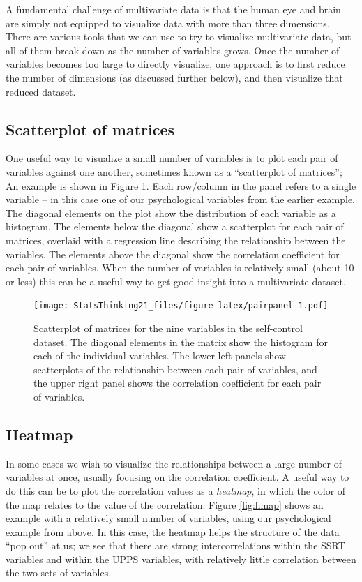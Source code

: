 \documentclass[
  12pt,
]{book}
\begin{document}
A fundamental challenge of multivariate data is that the human eye and brain are simply not equipped to visualize data with more than three dimensions. There are various tools that we can use to try to visualize multivariate data, but all of them break down as the number of variables grows. Once the number of variables becomes too large to directly visualize, one approach is to first reduce the number of dimensions (as discussed further below), and then visualize that reduced dataset.

\hypertarget{scatterplot-of-matrices}{%
\subsection{Scatterplot of matrices}\label{scatterplot-of-matrices}}

One useful way to visualize a small number of variables is to plot each pair of variables against one another, sometimes known as a ``scatterplot of matrices''; An example is shown in Figure \ref{fig:pairpanel}. Each row/column in the panel refers to a single variable -- in this case one of our psychological variables from the earlier example. The diagonal elements on the plot show the distribution of each variable as a histogram. The elements below the diagonal show a scatterplot for each pair of matrices, overlaid with a regression line describing the relationship between the variables. The elements above the diagonal show the correlation coefficient for each pair of variables. When the number of variables is relatively small (about 10 or less) this can be a useful way to get good insight into a multivariate dataset.

\begin{figure}
\centering
\texttt{[image: StatsThinking21\_files/figure-latex/pairpanel-1.pdf]}
\caption{\label{fig:pairpanel}Scatterplot of matrices for the nine variables in the self-control dataset. The diagonal elements in the matrix show the histogram for each of the individual variables. The lower left panels show scatterplots of the relationship between each pair of variables, and the upper right panel shows the correlation coefficient for each pair of variables.}
\end{figure}

\hypertarget{heatmap}{%
\subsection{Heatmap}\label{heatmap}}

In some cases we wish to visualize the relationships between a large number of variables at once, usually focusing on the correlation coefficient. A useful way to do this can be to plot the correlation values as a \emph{heatmap}, in which the color of the map relates to the value of the correlation. Figure \ref{fig:hmap} shows an example with a relatively small number of variables, using our psychological example from above. In this case, the heatmap helps the structure of the data ``pop out'' at us; we see that there are strong intercorrelations within the SSRT variables and within the UPPS variables, with relatively little correlation between the two sets of variables.
\end{document}
